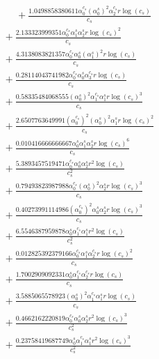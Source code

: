 \documentclass[10pt]{article}
\begin{document}
\begin{align*}
\phantom{R_{0,7}} &\phantom{={}}{}  + \frac{1.0498858380611 \alpha_{0}^{c_s} \left(\alpha_{0}^s\right)^{2} \alpha_{2}^{c_s} r \log{\left(c_{s} \right)}}{c_{s}} \\
&{}  + \frac{2.133323999351 \alpha_{0}^{c_s} \alpha_{1}^s \alpha_{2}^s r \log{\left(c_{s} \right)}^{2}}{c_{s}} \\
&{}  + \frac{4.3138083821357 \alpha_{0}^{c_s} \alpha_{0}^s \left(\alpha_{1}^s\right)^{2} r \log{\left(c_{s} \right)}}{c_{s}} \\
&{}  + \frac{0.28114043741982 \alpha_{0}^{c_s} \alpha_{0}^s \alpha_{3}^{c_s} r \log{\left(c_{s} \right)}}{c_{s}} \\
&{}  + \frac{0.58335484068555 \left(\alpha_{0}^s\right)^{2} \alpha_{1}^{c_s} \alpha_{1}^s r \log{\left(c_{s} \right)}^{3}}{c_{s}} \\
&{}  + \frac{2.6507763649991 \left(\alpha_{0}^{c_s}\right)^{2} \left(\alpha_{0}^s\right)^{2} \alpha_{1}^s r \log{\left(c_{s} \right)}^{2}}{c_{s}} \\
&{}  + \frac{0.010416666666667 \alpha_{0}^s \alpha_{1}^s \alpha_{2}^s r \log{\left(c_{s} \right)}^{6}}{c_{s}} \\
&{}  + \frac{5.3893457519471 \alpha_{0}^{c_s} \alpha_{0}^s \alpha_{2}^s r^{2} \log{\left(c_{s} \right)}}{c_{s}^{2}} \\
&{}  + \frac{0.79493823987988 \alpha_{0}^{c_s} \left(\alpha_{0}^s\right)^{2} \alpha_{2}^s r \log{\left(c_{s} \right)}^{3}}{c_{s}} \\
&{}  + \frac{0.40273991114986 \left(\alpha_{0}^{c_s}\right)^{2} \alpha_{0}^s \alpha_{2}^s r \log{\left(c_{s} \right)}^{3}}{c_{s}} \\
&{}  + \frac{6.5546387959878 \alpha_{0}^s \alpha_{1}^{c_s} \alpha_{1}^s r^{2} \log{\left(c_{s} \right)}}{c_{s}^{2}} \\
&{}  + \frac{0.012825392379166 \alpha_{0}^{c_s} \alpha_{1}^s \alpha_{2}^{c_s} r \log{\left(c_{s} \right)}^{2}}{c_{s}} \\
&{}  + \frac{1.7002909092331 \alpha_{0}^s \alpha_{1}^{c_s} \alpha_{2}^{c_s} r \log{\left(c_{s} \right)}}{c_{s}} \\
&{}  + \frac{3.5885065578923 \left(\alpha_{0}^s\right)^{2} \alpha_{1}^{c_s} \alpha_{1}^s r \log{\left(c_{s} \right)}}{c_{s}} \\
&{}  + \frac{0.4662162220819 \alpha_{0}^{c_s} \alpha_{0}^s \alpha_{2}^s r^{2} \log{\left(c_{s} \right)}^{3}}{c_{s}^{2}} \\
&{}  + \frac{0.23758419687749 \alpha_{0}^s \alpha_{1}^{c_s} \alpha_{1}^s r^{2} \log{\left(c_{s} \right)}^{3}}{c_{s}^{2}} \\

\end{align*}
\end{document}
